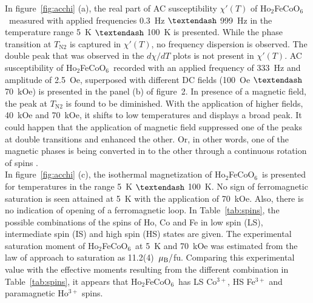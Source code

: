 \documentclass[12pt,twocolumns]{iopart}
\newcommand{\HFCO}{Ho$_2$FeCoO$_6$}
\begin{document}
In figure~\ref{fig:acchi} (a), the real part of AC susceptibility $\chi'(T)$
of \HFCO\ measured with applied frequencies 0.3~Hz $\textendash$ 999~Hz
in the temperature range 5~K $\textendash$ 100~K is presented.
While the phase transition at $T_\mathrm{N2}$ is captured in $\chi'(T)$,
no frequency dispersion is observed.
The double peak that was observed in the $d\chi/dT$ plots is not present
in $\chi'(T)$. AC susceptibility of \HFCO\ recorded with an applied frequency of
333~Hz and amplitude of 2.5~Oe, superposed with different DC fields
(100~Oe $\textendash$ 70~kOe) is presented in the panel (b) of figure~2.
In presence of a magnetic field, the peak at $T_\mathrm{N2}$ is found to be 
diminished. With the application of higher fields, 40~kOe and 70~kOe, it shifts 
to low temperatures and displays a broad peak. 
It could happen that the application of magnetic field suppressed one of the peaks
at double transitions and enhanced the other.
Or, in other words, one of the magnetic phases is being
converted in to the other through a continuous rotation of
spins \cite{belov1976spin,gorodetsky1969spin}.
\\
In figure~\ref{fig:acchi} (c), the isothermal magnetization of
\HFCO\ is presented for temperatures in the range 5~K $\textendash$ 100~K.
No sign of ferromagnetic saturation is seen attained at 5~K with the application of 70~kOe.
Also, there is no indication of opening of a ferromagnetic loop.
In Table~\ref{tab:spins}, the possible combinations of the spins of Ho, Co and Fe in
low spin (LS), intermediate spin (IS) and high spin (HS) states are given.
The experimental saturation moment of \HFCO\ at 5~K and 70~kOe was estimated
from the law of approach to saturation as 11.2(4)~$\mu_\mathrm{\tiny B}/$fu.
Comparing this experimental value with the effective moments resulting from the
different combination in Table~\ref{tab:spins}, it appears that \HFCO\ has LS Co$^{3+}$,
HS Fe$^{3+}$ and paramagnetic Ho$^{3+}$ spins. 
\end{document}
